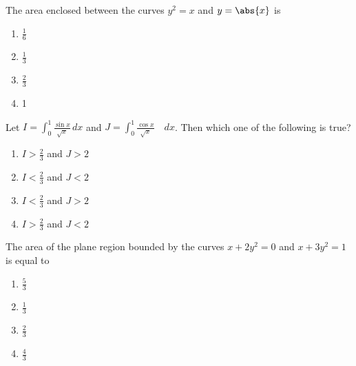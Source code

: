 		  The area enclosed between the curves $y^{2}=x$ and $y=\abs{x}$ is
		 \hfill {}
		 \begin{enumerate}
		     \item $\frac{1}{6}$
		     \item $\frac{1}{3}$
		     \item $\frac{2}{3}$
		     \item 1
		 \end{enumerate}
	   \item 
		 Let $I=\int_{0}^{1} \frac{\sin x}{\sqrt{x}} \,dx$ and $J=\int_{0}^{1} \frac{\cos x}{\sqrt{x}} \quad dx$. Then which one of the following is true?
		\hfill {} 
		\begin{enumerate}
		    \item $I>\frac{2}{3}$ and $J>2$
		    \item $I<\frac{2}{3}$ and $J<2$
		    \item $I<\frac{2}{3}$ and $J>2$
		    \item $I>\frac{2}{3}$ and $J<2$
		\end{enumerate}
	   \item 
		 The area of the plane region bounded by the curves $x+2y^{2}=0$ and $x+3y^{2}=1$ is equal to  
		\hfill {}
		\begin{enumerate}
		   \item $\frac{5}{3}$
		   \item $\frac{1}{3}$
		   \item $\frac{2}{3}$
		   \item $\frac{4}{3}$
		\end{enumerate}
% 
